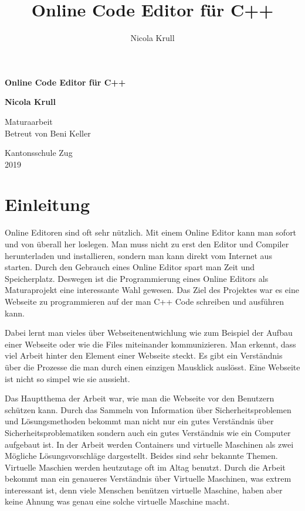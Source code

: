 \documentclass[10pt]{article}
\title{Online Code Editor für C++}
\author{Nicola Krull}
\begin{document}
	
	\begin{titlepage}
	\begin{center}
	
	
	\huge
	\textbf{Online Code Editor für C++}
	
	\vspace{8cm}	
	
	\LARGE
	\textbf{Nicola Krull}
	
	\vspace{1cm}	

	\Large
	Maturaarbeit\\
	Betreut von
	Beni Keller
	
	\vspace{0.8cm}	

	 
	 Kantonsschule Zug\\
	 2019
	\end{center}
\end{titlepage}
	
	\tableofcontents
	\newpage
	
	\section{Einleitung}
	Online Editoren sind oft sehr nützlich. Mit einem Online Editor kann man sofort und von überall her loslegen. Man muss nicht zu erst den Editor und Compiler herunterladen und installieren, sondern man kann direkt vom Internet aus starten. Durch den Gebrauch eines Online Editor spart man Zeit und Speicherplatz. Deswegen ist die Programmierung eines Online Editors als Maturaprojekt eine interessante Wahl gewesen. Das Ziel des Projektes war es eine Webseite zu programmieren auf der man C++ Code schreiben und ausführen kann.
	
	Dabei lernt man vieles über Webseitenentwichlung wie zum Beispiel der Aufbau einer Webseite oder wie die Files miteinander kommunizieren. Man erkennt, dass viel Arbeit hinter den Element einer Webseite steckt. Es gibt ein Verständnis über die Prozesse die man durch einen einzigen Mausklick auslösst. Eine Webseite ist nicht so simpel wie sie aussieht.
	
	Das Hauptthema der Arbeit war, wie man die Webseite vor den Benutzern schützen kann. Durch das Sammeln von Information über Sicherheitsproblemen und Lösungsmethoden bekommt man nicht nur ein gutes Verständnis über Sicherheitsproblematiken sondern auch ein gutes Verständnis wie ein Computer aufgebaut ist. In der Arbeit werden Containers und virtuelle  Maschinen als zwei Mögliche Lösungsvorschläge dargestellt. Beides sind sehr bekannte Themen. Virtuelle Maschien werden heutzutage oft im Altag benutzt. Durch die Arbeit bekommt man ein genaueres Verständnis über Virtuelle Maschinen, was extrem interessant ist, denn viele Menschen benützen virtuelle Maschine, haben aber keine Ahnung was genau eine solche virtuelle Maschine macht.
	\pagebreak
\end{document}
